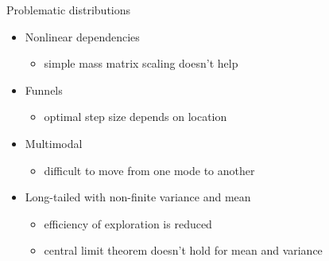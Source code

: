\documentclass[finnish,english,t]{beamer}
\begin{document}
\begin{frame}{Problematic distributions}

  \begin{itemize}
  \item Nonlinear dependencies
    \begin{itemize}
    \item simple mass matrix scaling doesn't help
    \end{itemize}
  \item Funnels
    \begin{itemize}
    \item optimal step size depends on location
    \end{itemize}
  \item Multimodal
    \begin{itemize}
    \item difficult to move from one mode to another
    \end{itemize}
  \item Long-tailed with non-finite variance and mean
    \begin{itemize}
    \item efficiency of exploration is reduced
    \item central limit theorem doesn't hold for mean and variance
    \end{itemize}
  \end{itemize}

\end{frame}
\end{document}
